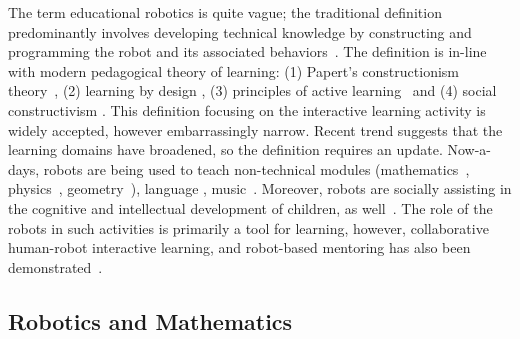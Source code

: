 \documentclass[conference]{IEEEtran}
\begin{document}
The term educational robotics is quite vague; the traditional definition predominantly involves developing technical 
knowledge by constructing and programming the robot and its associated behaviors~\cite{hsiu2003designing, 
barker2007robotics, balch2008designing}. The definition is in-line with modern pedagogical theory of learning: (1) 
Papert's constructionism theory~\cite{papert1980mindstorms, ackermann2001piaget}, (2) learning by design 
\cite{goldman2004using}, (3) principles of active learning~\cite{harmin2006inspiring} and (4) social constructivism 
\cite{vygotsky1980mind}. This definition focusing on the interactive learning activity is widely accepted, however 
embarrassingly narrow. Recent trend suggests that the learning domains have broadened, so the definition requires an 
update. Now-a-days, robots are being used to teach non-technical modules (mathematics~\cite{highfield2008early, 
robotmath}, physics~\cite{mitnik2008autonomous}, geometry~\cite{mitnik2008autonomous, robotmath}), language 
\cite{kanda2004interactive, han2009r}, music~\cite{han2009physical}. Moreover, robots are socially assisting in the 
cognitive and intellectual development of children, as well~\cite{mataric1999socially}. The role of the robots in such 
activities is primarily a tool for learning, however, collaborative human-robot interactive learning, and robot-based 
mentoring has also been demonstrated~\cite{mitnik2008autonomous}.

\subsection{Robotics and Mathematics}
\end{document}
